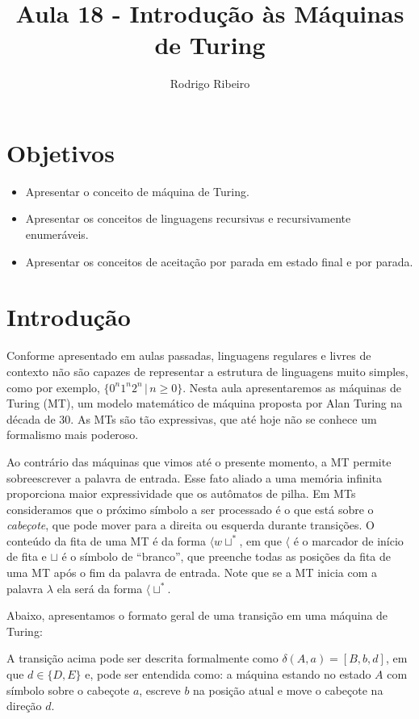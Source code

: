 \documentclass[a4paper]{article}
\theoremstyle{definition}
\begin{document}
\title{Aula 18 - Introdução às Máquinas de Turing}
  \author{Rodrigo Ribeiro}

  \maketitle


  \pagestyle{fancy}


  \section*{Objetivos}

  \begin{itemize}
     \item Apresentar o conceito de máquina de Turing.
     \item Apresentar os conceitos de linguagens recursivas
       e recursivamente enumeráveis.
     \item Apresentar os conceitos de aceitação por parada em
           estado final e por parada.
  \end{itemize}

  \section{Introdução}

  Conforme apresentado em aulas passadas, linguagens regulares e livres de
  contexto não são capazes de representar a estrutura de linguagens muito
  simples, como por exemplo, $\{0^n1^n2^n\,|\,n\geq 0\}$. Nesta aula
  apresentaremos as máquinas de Turing (MT), um modelo matemático de máquina
  proposta por Alan Turing na década de 30. As MTs são tão
  expressivas, que até hoje não se conhece um formalismo mais poderoso.

  Ao contrário das máquinas que vimos até o presente momento, a MT
  permite sobreescrever a palavra de entrada. Esse fato aliado a
  uma memória infinita proporciona maior expressividade que os autômatos de
  pilha. Em MTs consideramos que o próximo símbolo a ser
  processado é o que está sobre o \emph{cabeçote}, que pode mover para a
  direita ou esquerda durante transições. O conteúdo da fita de uma MT é
  da forma $\langle w \sqcup^*$, em que $\langle$ é o marcador de início de fita
  e $\sqcup$ é o símbolo de ``branco'', que preenche todas as posições da fita
  de uma MT após o fim da palavra de entrada. Note que se a MT inicia com a
  palavra $\lambda$ ela será da forma $\langle \sqcup^*$.

  Abaixo, apresentamos o formato geral de uma transição em uma máquina de Turing:
  \begin{figure}[H]
    \centering
  \end{figure}
  A transição acima pode ser descrita formalmente como $\delta(A,a) = [B,b,d]$,
  em que $d \in \{D,E\}$ e, pode ser entendida como: a máquina estando no estado
  $A$ com símbolo sobre o cabeçote $a$, escreve $b$ na posição atual e move o
  cabeçote na direção $d$.
\end{document}
